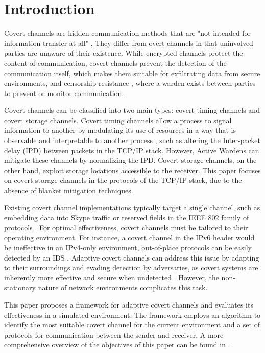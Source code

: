 \chapter{Introduction}
\label{ch:introduction}

Covert channels are hidden communication methods that are "not intended for information transfer at all" \cite{ANOTCP}. They differ from overt channels in that uninvolved parties are unaware of their existence. While encrypted channels protect the content of communication, covert channels prevent the detection of the communication itself, which makes them suitable for exfiltrating data from secure environments, and censorship resistance \cite{TWACCS}, where a warden exists between parties to prevent or monitor communication.

Covert channels can be classified into two main types: covert timing channels and covert storage channels. Covert timing channels allow a process to signal information to another by modulating its use of resources in a way that is observable and interpretable to another process \cite{TCSEC}, such as altering the Inter-packet delay (IPD) between packets in the TCP/IP stack. However, Active Wardens \cite{DIAWAPSCC} can mitigate these channels by normalizing the IPD. Covert storage channels, on the other hand, exploit storage locations accessible to the receiver. This paper focuses on covert storage channels in the protocols of the TCP/IP stack, due to the absence of blanket mitigation techniques.

Existing covert channel implementations typically target a single channel, such as embedding data into Skype traffic \cite{DAMBCTCST} or reserved fields in the IEEE 802 family of protocols \cite{CCiLANP}. For optimal effectiveness, covert channels must be tailored to their operating environment. For instance, a covert channel in the IPv6 header would be ineffective in an IPv4-only environment, out-of-place protocols can be easily detected by an IDS \cite{TWACCS}. Adaptive covert channels can address this issue by adapting to their surroundings and evading detection by adversaries, as covert systems are inherently more effective and secure when undetected \cite{GUCCA}. However, the non-stationary nature of network environments \cite{PNFD} complicates this task.

This paper proposes a framework for adaptive covert channels and evaluates its effectiveness in a simulated environment. The framework employs an algorithm to identify the most suitable covert channel for the current environment and a set of protocols for communication between the sender and receiver. A more comprehensive overview of the objectives of this paper can be found in .
